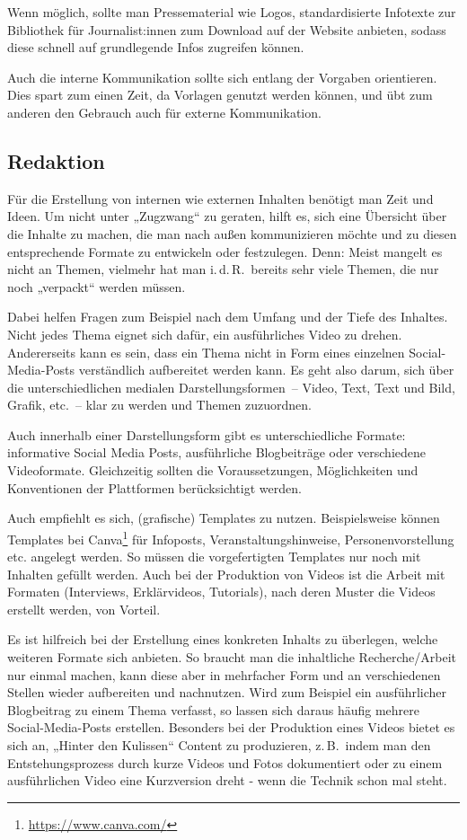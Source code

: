 \documentclass[
  11pt,
  letterpaper,
  DIV=11,
  twoside]{scrreprt}
\DeclareRobustCommand{\href}[2]{#2\footnote{\url{#1}}}
\begin{document}
Wenn möglich, sollte man Pressematerial wie Logos, standardisierte
Infotexte zur Bibliothek für Journalist:innen zum Download auf der
Website anbieten, sodass diese schnell auf grundlegende Infos zugreifen
können.

Auch die interne Kommunikation sollte sich entlang der Vorgaben
orientieren. Dies spart zum einen Zeit, da Vorlagen genutzt werden
können, und übt zum anderen den Gebrauch auch für externe Kommunikation.

\subsection{Redaktion}\label{redaktion}

Für die Erstellung von internen wie externen Inhalten benötigt man Zeit
und Ideen. Um nicht unter „Zugzwang`` zu geraten, hilft es, sich eine
Übersicht über die Inhalte zu machen, die man nach außen kommunizieren
möchte und zu diesen entsprechende Formate zu entwickeln oder
festzulegen. Denn: Meist mangelt es nicht an Themen, vielmehr hat man
i.\,d.\,R.~bereits sehr viele Themen, die nur noch „verpackt`` werden
müssen.

Dabei helfen Fragen zum Beispiel nach dem Umfang und der Tiefe des
Inhaltes. Nicht jedes Thema eignet sich dafür, ein ausführliches Video
zu drehen. Andererseits kann es sein, dass ein Thema nicht in Form eines
einzelnen Social-Media-Posts verständlich aufbereitet werden kann. Es
geht also darum, sich über die unterschiedlichen medialen
Darstellungsformen~-- Video, Text, Text und Bild, Grafik, etc.~-- klar
zu werden und Themen zuzuordnen.

Auch innerhalb einer Darstellungsform gibt es unterschiedliche Formate:
informative Social Media Posts, ausführliche Blogbeiträge oder
verschiedene Videoformate. Gleichzeitig sollten die Voraussetzungen,
Möglichkeiten und Konventionen der Plattformen berücksichtigt werden.

Auch empfiehlt es sich, (grafische) Templates zu nutzen. Beispielsweise
können Templates bei \href{https://www.canva.com/}{Canva} für Infoposts,
Veranstaltungshinweise, Personenvorstellung etc. angelegt werden. So
müssen die vorgefertigten Templates nur noch mit Inhalten gefüllt
werden. Auch bei der Produktion von Videos ist die Arbeit mit Formaten
(Interviews, Erklärvideos, Tutorials), nach deren Muster die Videos
erstellt werden, von Vorteil.

Es ist hilfreich bei der Erstellung eines konkreten Inhalts zu
überlegen, welche weiteren Formate sich anbieten. So braucht man die
inhaltliche Recherche/Arbeit nur einmal machen, kann diese aber in
mehrfacher Form und an verschiedenen Stellen wieder aufbereiten und
nachnutzen. Wird zum Beispiel ein ausführlicher Blogbeitrag zu einem
Thema verfasst, so lassen sich daraus häufig mehrere Social-Media-Posts
erstellen. Besonders bei der Produktion eines Videos bietet es sich an,
„Hinter den Kulissen`` Content zu produzieren, z.\,B.~indem man den
Entstehungsprozess durch kurze Videos und Fotos dokumentiert oder zu
einem ausführlichen Video eine Kurzversion dreht - wenn die Technik
schon mal steht.
\end{document}
